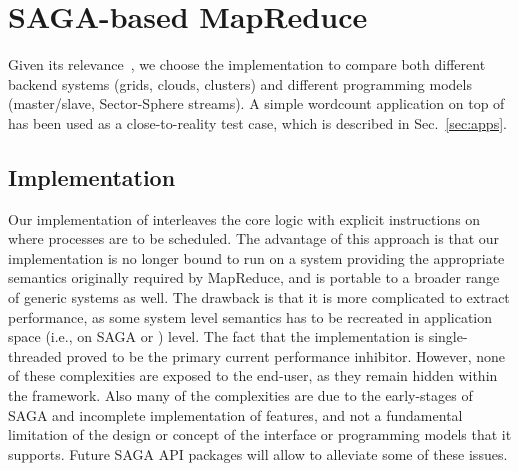 \documentclass[3p,twocolumn]{elsarticle}
\begin{document}
\section{SAGA-based MapReduce}
\label{sec:mr}

 Given its relevance~\cite{saga_ccgrid09}, we choose the \smr
 implementation to compare both different backend systems (grids,
 clouds, clusters) and different programming models (master/slave,
 Sector-Sphere streams).  A simple wordcount application on top of
 \smr has been used as a close-to-reality test case, which is
 described in Sec.~\ref{sec:apps}.


\subsection{\sagamapreduce Implementation}


Our implementation of \sagamapreduce interleaves the core \MR logic
with explicit instructions on where processes are to be scheduled.
The advantage of this approach is that our implementation is no longer
bound to run on a system providing the appropriate semantics
originally required by MapReduce, and is portable to a broader range
of generic systems as well.  The drawback is that it is more
complicated to extract performance, as some system level semantics has
to be recreated in application space (i.e., on SAGA or \smr) level.
The fact that the implementation is single-threaded proved to be the
primary current performance inhibitor.  However, none of these
complexities are exposed to the end-user, as they remain hidden within
the framework. Also many of the complexities are due to the
early-stages of SAGA and incomplete implementation of features, and
not a fundamental limitation of the design or concept of the interface
or programming models that it supports.  Future SAGA API packages will
allow to alleviate some of these issues.
\end{document}
